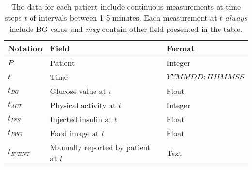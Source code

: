 \medskip
\begin{table}[h]
\begin{center}
  \begin{tabular}{lll}
  \textbf{Notation} &
  \textbf{Field} &
  \textbf{Format} \\
  \hline
  $P$ &
  Patient &
  Integer \\
  $t$ &
  Time &
  $YYMMDD:HHMMSS$ \\
  $t_{BG}$ &
  Glucose value at $t$ &
  Float \\
  $t_{ACT}$ &
  Physical activity at $t$ &
  Integer \\
  $t_{INS}$ &
  Injected insulin at $t$ &
  Float \\
  $t_{IMG}$ &
  Food image at $t$ &
  Float \\
  $t_{EVENT}$ &
  Manually reported by patient at $t$ &
  Text \\
  \hline
  \end{tabular}
  \caption[]
  {\small The data for each patient include continuous measurements at time steps $t$ of intervals between 1-5 minutes. Each measurement at $t$ \textit{always} include BG value and \textit{may} contain other field presented in the table.}
  \label{table:data_description}
\end{center}
\end{table}
